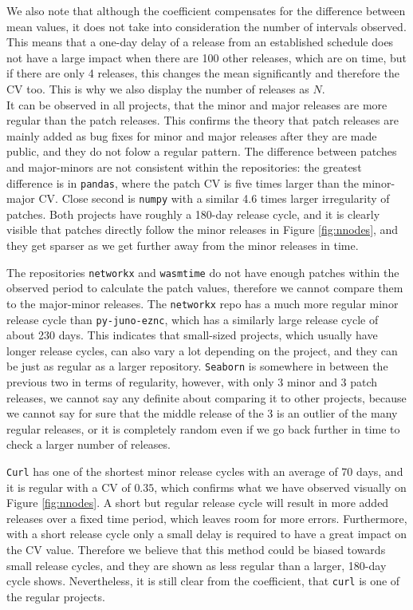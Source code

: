 We also note that although the coefficient compensates for the difference between mean values, it does not take into consideration the number of intervals observed. This means that a one-day delay of a release from an established schedule does not have a large impact when there are 100 other releases, which are on time, but if there are only 4 releases, this changes the mean significantly and therefore the CV too. This is why we also display the number of releases as $N$. \\

It can be observed in all projects, that the minor and major releases are more regular than the patch releases. This confirms the theory that patch releases are mainly added as bug fixes for minor and major releases after they are made public, and they do not folow a regular pattern. The difference between patches and major-minors are not consistent within the repositories: the greatest difference is in \texttt{pandas}, where the patch CV is five times larger than the minor-major CV. Close second is \texttt{numpy} with a similar 4.6 times larger irregularity of patches. Both projects have roughly a 180-day release cycle, and it is clearly visible that patches directly follow the minor releases in Figure \ref{fig:nnodes}, and they get sparser as we get further away from the minor releases in time.

The repositories \texttt{networkx} and \texttt{wasmtime} do not have enough patches within the observed period to calculate the patch values, therefore we cannot compare them to the major-minor releases. The \texttt{networkx} repo has a much more regular minor release cycle than \texttt{py-juno-eznc}, which has a similarly large release cycle of about 230 days. This indicates that small-sized projects, which usually have longer release cycles, can also vary a lot depending on the project, and they can be just as regular as a larger repository. \texttt{Seaborn} is somewhere in between the previous two in terms of regularity, however, with only 3 minor and 3 patch releases, we cannot say any definite about comparing it to other projects, because we cannot say for sure that the middle release of the 3 is an outlier of the many regular releases, or it is completely random even if we go back further in time to check a larger number of releases.

\texttt{Curl} has one of the shortest minor release cycles with an average of 70 days, and it is regular with a CV of $0.35$, which confirms what we have observed visually on Figure \ref{fig:nnodes}. A short but regular release cycle will result in more added releases over a fixed time period, which leaves room for more errors. Furthermore, with a short release cycle only a small delay is required to have a great impact on the CV value. Therefore we believe that this method could be biased towards small release cycles, and they are shown as less regular than a larger, 180-day cycle shows. Nevertheless, it is still clear from the coefficient, that \texttt{curl} is one of the regular projects.

